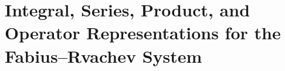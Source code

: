 \documentclass[11pt]{article}
\theoremstyle{definition}
\theoremstyle{remark}
\begin{document}
\setcounter{section}{0}
\renewcommand{\thesection}{\arabic{section}}
\newenvironment{statusboxPartiv}[1]{%
  \par\medskip\begin{center}\begin{minipage}{0.94\textwidth}%
  \hrule\medskip\textbf{#1.}\ }%
  {\par\medskip\hrule\end{minipage}\end{center}\medskip}
\clearpage
\part{Integral, Series, Product, and Operator Representations
for the Fabius--Rvachev System}
\end{document}
